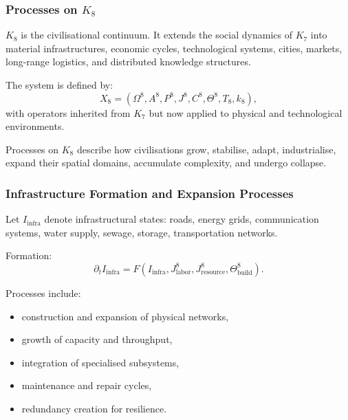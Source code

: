 

\subsubsection{Processes on \texorpdfstring{$K_8$}{K_8}}
\label{sec:processes-k8}

$K_8$ is the civilisational continuum.
It extends the social dynamics of $K_7$ into material infrastructures,
economic cycles, technological systems, cities, markets,
long-range logistics, and distributed knowledge structures.

The system is defined by:
\[
X_8 = (\Omega^8, A^8, P^8, J^8, C^8, \Theta^8, T_8, k_8),
\]
with operators inherited from $K_7$ but now applied to physical and
technological environments.

Processes on $K_8$ describe how civilisations grow, stabilise, adapt,
industrialise, expand their spatial domains, accumulate complexity,
and undergo collapse.

\subsubsection{Infrastructure Formation and Expansion Processes}

Let $I_{\text{infra}}$ denote infrastructural states: roads, energy grids,
communication systems, water supply, sewage, storage, transportation networks.

Formation:
\[
\partial_t I_{\text{infra}} =
F(I_{\text{infra}}, J^8_{\text{labor}}, J^8_{\text{resource}}, \Theta^8_{\text{build}}).
\]

Processes include:
\begin{itemize}
    \item construction and expansion of physical networks,
    \item growth of capacity and throughput,
    \item integration of specialised subsystems,
    \item maintenance and repair cycles,
    \item redundancy creation for resilience.
\end{itemize}

